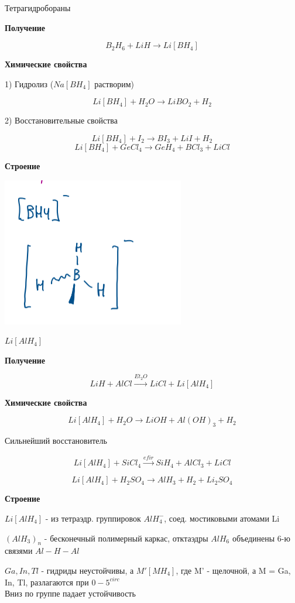 \documentclass[14pt,a4paper]{scrartcl}
\begin{document}
Тетрагидробораны

\textbf{Получение}

$$B_2H_6 + LiH \rightarrow Li[BH_4]$$

\textbf{Химические свойства}

1) Гидролиз ($Na[BH_4]$ растворим)

$$Li[BH_4] + H_2O \rightarrow LiBO_2 + H_2$$

2) Восстановительные свойства

$$Li[BH_4] + I_2 \rightarrow BI_3 + LiI + H_2$$
$$Li[BH_4] + GeCl_4 \rightarrow GeH_4 + BCl_3 + LiCl$$

\textbf{Строение}

\includegraphics{11v4.png}

$Li[AlH_4]$

\textbf{Получение}

$$LiH + AlCl \xrightarrow{Et_2O} LiCl + Li[AlH_4]$$

\textbf{Химические свойства}

$$Li[AlH_4] + H_2O \rightarrow LiOH + Al(OH)_3 + H_2$$

Сильнейший восстановитель

$$Li[AlH_4] + SiCl_4 \xrightarrow{efir} SiH_4 + AlCl_3 + LiCl$$

$$Li[AlH_4]  + H_2SO_4 \rightarrow AlH_3 + H_2 +Li_2SO_4$$

\textbf{Строение}

$Li[AlH_4]$ - из тетраэдр. группировок $AlH_4^-$, соед. мостиковыми атомами Li

$(AlH_3)_n$ - бесконечный полимерный каркас, отктаэдры $AlH_6$ объединены 6-ю связями $Al-H-Al$


$Ga, In, Tl$ - гидриды неустойчивы, а $M'[MH_4]$, где M' - щелочной,  а M = Ga, In, Tl, разлагаются при $0-5^{circ}$\\
Вниз по группе падает устойчивость\\
\end{document}
